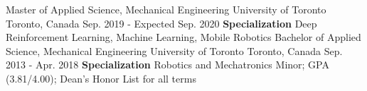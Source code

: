 \begin{cventries}
  \cventry
    {Master of Applied Science, Mechanical Engineering}
    {University of Toronto}
    {Toronto, Canada}
    {Sep. 2019 - Expected Sep. 2020}
    {\textbf{Specialization} Deep Reinforcement Learning, Machine Learning, Mobile Robotics}
  \cventry
    {Bachelor of Applied Science, Mechanical Engineering}
    {University of Toronto}
    {Toronto, Canada}
    {Sep. 2013 - Apr. 2018}
    {\textbf{Specialization} Robotics and Mechatronics Minor; GPA (3.81/4.00); Dean's Honor List for all terms}
\end{cventries}

